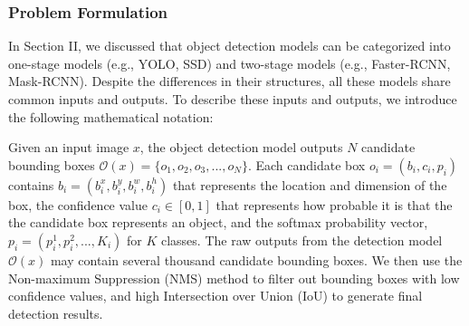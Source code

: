 \subsubsection{Problem Formulation} 


In Section II, we discussed that object detection models can be categorized into one-stage models (e.g., YOLO, SSD) and two-stage models (e.g., Faster-RCNN, Mask-RCNN). Despite the differences in their structures, all these models share common inputs and outputs. To describe these inputs and outputs, we introduce the following mathematical notation:


Given an input image $x$, the object detection model outputs $N$ candidate bounding boxes $\mathcal{O}(x) = \{o_1, o_2, o_3, ..., o_N\}$. Each candidate box $o_i=(b_i, c_i, p_i)$ contains $b_i=(b^x_i, b^y_i, b^w_i, b^h_i)$ that represents the location and dimension of the box, the confidence value $c_i \in [0, 1]$ that represents how probable it is that the the candidate box represents an object, and the softmax probability vector, $p_i=(p^1_i, p^2_i, ..., K_i)$ for $K$ classes. The raw outputs from the detection model $\mathcal{O}(x)$ may contain several thousand candidate bounding boxes. We then use the Non-maximum Suppression (NMS) method \cite{bodla2017soft} to filter out bounding boxes with low confidence values, and high Intersection over Union (IoU) to generate final detection results.

